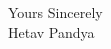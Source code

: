 \documentclass[a4paper,english]{friggeri-letter}
\begin{document}

\vspace*{0.1cm}
\closing{
   Yours Sincerely\\
   Hetav Pandya}
\end{document}
